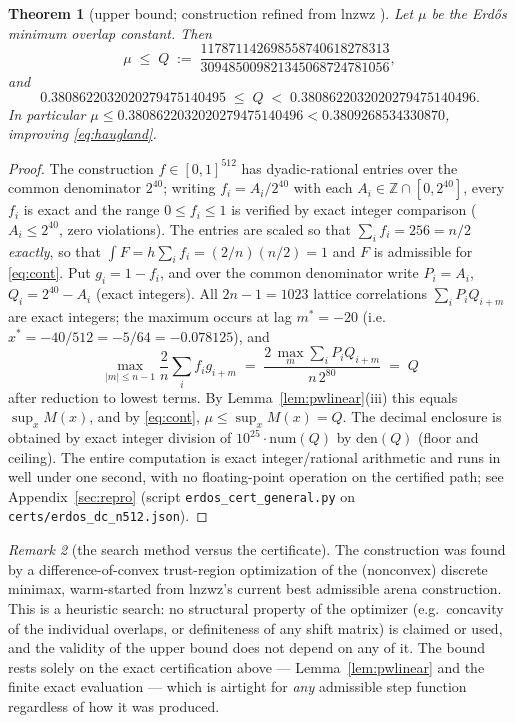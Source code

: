 \documentclass[11pt]{article}
\newtheorem{theorem}{Theorem}
\theoremstyle{remark}
\newtheorem{remark}[theorem]{Remark}
\newcommand{\ZZ}{\mathbb{Z}}
\begin{document}
\begin{theorem}[upper bound; construction refined from lnzwz \cite{Arena26}]
\label{thm:upper}
Let $\mu$ be the Erd\H{o}s minimum overlap constant. Then
\[
\mu \;\le\; Q \;:=\;
\frac{117871142698558740618278313}
     {309485009821345068724781056},
\]
and
\[
0.3808622032020279475140495 \;\le\; Q \;<\; 0.3808622032020279475140496 .
\]
In particular $\mu \le 0.3808622032020279475140496 <
0.3809268534330870$, improving \eqref{eq:haugland}.
\end{theorem}

\begin{proof}
The construction $f \in [0,1]^{512}$ has dyadic-rational entries over the
common denominator $2^{40}$; writing $f_i = A_i / 2^{40}$ with each
$A_i \in \ZZ \cap [0, 2^{40}]$, every $f_i$ is exact and the range
$0 \le f_i \le 1$ is verified by exact integer comparison
($A_i \le 2^{40}$, zero violations). The entries are scaled so that
$\sum_i f_i = 256 = n/2$ \emph{exactly}, so that
$\int F = h\sum_i f_i = (2/n)(n/2) = 1$ and $F$ is admissible for
\eqref{eq:cont}. Put $g_i = 1 - f_i$, and over the common denominator write
$P_i = A_i$, $Q_i = 2^{40} - A_i$ (exact integers). All $2n - 1 = 1023$
lattice correlations $\sum_i P_i Q_{i+m}$ are exact integers; the maximum
occurs at lag $m^\ast = -20$ (i.e. $x^\ast = -40/512 = -5/64 = -0.078125$),
and
\[
\max_{|m|\le n-1} \frac{2}{n} \sum_i f_i g_{i+m}
\;=\; \frac{2\,\max_m \sum_i P_i Q_{i+m}}{n\, 2^{80}} \;=\; Q
\]
after reduction to lowest terms. By Lemma~\ref{lem:pwlinear}(iii) this equals
$\sup_x M(x)$, and by \eqref{eq:cont}, $\mu \le \sup_x M(x) = Q$. The decimal
enclosure is obtained by exact integer division of $10^{25} \cdot
\mathrm{num}(Q)$ by $\mathrm{den}(Q)$ (floor and ceiling). The entire
computation is exact integer/rational arithmetic and runs in well under one
second, with no floating-point operation on the certified path; see
Appendix~\ref{sec:repro} (script \texttt{erdos\_cert\_general.py} on
\texttt{certs/erdos\_dc\_n512.json}).
\end{proof}

\begin{remark}[the search method versus the certificate]
The construction was found by a difference-of-convex trust-region
optimization of the (nonconvex) discrete minimax, warm-started from lnzwz's
current best admissible arena construction. This is a heuristic search: no
structural property of the optimizer (e.g.\ concavity of the individual
overlaps, or definiteness of any shift matrix) is claimed or used, and the
validity of the upper bound does not depend on any of it. The bound rests
solely on the exact certification above --- Lemma~\ref{lem:pwlinear} and the
finite exact evaluation --- which is airtight for \emph{any} admissible step
function regardless of how it was produced.
\end{remark}
\end{document}
